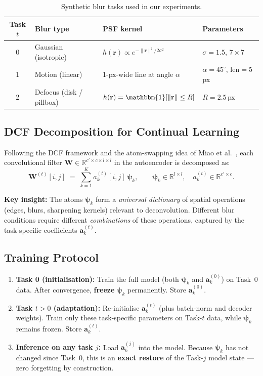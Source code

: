\documentclass[11pt,letterpaper]{article}
\newcommand{\R}{\mathbb{R}}
\newcommand{\W}{\mathbf{W}}
\renewcommand{\a}{\mathbf{a}}
\newcommand{\psivec}{\boldsymbol{\psi}}
\begin{document}
\begin{table}[h]
\centering
\caption{Synthetic blur tasks used in our experiments.}
\label{tab:tasks}
\begin{tabular}{clll}
\toprule
Task $t$ & Blur type & PSF kernel & Parameters \\
\midrule
0 & Gaussian (isotropic) & $h(\mathbf{r}) \propto e^{-\|\mathbf{r}\|^2 / 2\sigma^2}$ & $\sigma=1.5$, $7{\times}7$ \\
1 & Motion (linear)      & 1-px-wide line at angle $\alpha$ & $\alpha{=}45^\circ$, len$=5$\,px \\
2 & Defocus (disk / pillbox) & $h(\mathbf{r}) = \mathbbm{1}[\|\mathbf{r}\| \leq R]$ & $R{=}2.5$\,px \\
\bottomrule
\end{tabular}
\end{table}

\subsection{DCF Decomposition for Continual Learning}

Following the DCF framework \cite{qiu2018dcfnet} and the atom-swapping idea
of Miao et al.~\cite{miao2021continual}, each convolutional filter
$\W \in \R^{c'{\times}c{\times}l{\times}l}$ in the autoencoder is decomposed as:
\begin{equation}
\W^{(t)}[i,j] \;=\; \sum_{k=1}^{K} a_k^{(t)}[i,j]\,\psivec_k,
\qquad
\psivec_k \in \R^{l{\times}l},\quad
a_k^{(t)} \in \R^{c'{\times}c}.
\label{eq:dcf}
\end{equation}

\textbf{Key insight:}  The atoms $\psivec_k$ form a \emph{universal dictionary}
of spatial operations (edges, blurs, sharpening kernels) relevant to
deconvolution.  Different blur conditions require different \emph{combinations}
of these operations, captured by the task-specific coefficients
$\a_k^{(t)}$.

\subsection{Training Protocol}

\begin{enumerate}[leftmargin=*]
    \item \textbf{Task 0 (initialisation):}  Train the full model (both
          $\psivec_k$ and $\a_k^{(0)}$) on Task~0 data.  After convergence,
          \textbf{freeze} $\psivec_k$ permanently.  Store $\a_k^{(0)}$.

    \item \textbf{Task $t > 0$ (adaptation):}  Re-initialise
          $\a_k^{(t)}$ (plus batch-norm and decoder weights).  Train only these
          task-specific parameters on Task-$t$ data, while $\psivec_k$ remains
          frozen.  Store $\a_k^{(t)}$.

    \item \textbf{Inference on any task $j$:}  Load $\a_k^{(j)}$ into the model.
          Because $\psivec_k$ has not changed since Task~0, this is an
          \textbf{exact restore} of the Task-$j$ model state ---
          zero forgetting by construction.
\end{enumerate}
\end{document}
